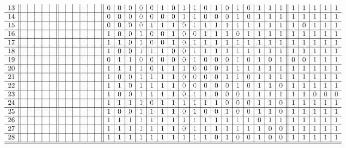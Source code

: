 \begin{table}
\[{\begin{array}{l||c|c|c|c|c||c|c|c|c|c|c||c|c|c|c|c|c|c|c|c|c|c|c|c|c|c|c|c||c|c|c|c|c}
		13 & &  &  &  &  &  &  &  &  &  &  &0 & 0 & 0 & 0 & 0 & 1 & 0 & 1 & 1 & 0 & 1 & 0 & 1 & 0 & 1 & 1 & 1&1 & 1 & 1 & 1 & 1 \\ \hline
		14 &&  &  &  &  &  &  &  &  &  &  & 0 & 0 & 0 & 0 & 0 & 0 & 0 & 1 & 1 & 0 & 0 & 0 & 1 & 0 & 1 & 1 & 1&1 & 1 & 1 & 1 & 1 \\ \hline
		15 & &  &  &  &  &  &  &  &  &  &  &0 & 0 & 0 & 0 & 1 & 1 & 1 & 0 & 1 & 1 & 1 & 1 & 1 & 1 & 1 & 1 & 1&1 & 0 & 1 & 1 & 1 \\ \hline
		16 & &  &  &  &  &  &  &  &  &  &  &1 & 0 & 0 & 1 & 0 & 0 & 1 & 0 & 0 & 1 & 1 & 1 & 0 & 1 & 1 & 1 & 1&1 & 1 & 1 & 1 & 1 \\ \hline
		17 & &  &  &  &  &  &  &  &  &  &  &1 & 1 & 0 & 1 & 0 &0 & 1 & 0 & 1 & 1 & 1 & 1 & 1 & 1 & 1 & 1 & 1&1 & 1 & 1 & 1 & 1 \\ \hline
		18 & &  &  &  &  &  &  &  &  &  &  &1 & 0 & 0 & 1 & 1 & 1 & 0 & 0 & 1 & 1 & 1 & 1 & 1 & 1 & 1 & 1 & 1&1 & 1 & 1 & 1 & 1 \\ \hline
		19 & &  &  &  &  &  &  &  &  &  &  &0 & 1 & 1 & 0 & 0 & 0 & 0 & 0 & 1 & 0 & 0 & 0 & 1 & 0 & 1 & 0 & 1&0 & 0 & 1 & 1 & 1 \\ \hline
		20 & &  &  &  &  &  &  &  &  &  &  &1 & 1 & 1 & 1 & 0 & 1 & 1 & 1 & 0 & 0 & 0 & 1 & 1 & 1 & 1 & 1 & 1&1 & 1 & 1 & 1 & 1 \\ \hline
		21 & &  &  &  &  &  &  &  &  &  &  &1 & 0 & 0 & 1 & 1 & 1 & 1 & 0 & 0 & 0 & 0 & 1 & 1 & 0 & 1 & 1 & 1&1 & 1 & 1 & 1 & 1 \\ \hline
		22 & &  &  &  &  &  &  &  &  &  &  &1 & 1 & 0 & 1 & 1 & 1 & 1 & 0 & 0 & 0 & 0 & 0 & 1 & 0 & 1 & 1 & 0&1 & 1 & 1 & 1 & 1 \\ \hline
		23 & &  &  &  &  &  &  &  &  &  &  &1 & 0 & 0 & 1 & 1 & 1 & 1 & 0 & 1 & 1 & 0 & 0 & 0 & 1 & 1 & 1 & 1&1 & 1 & 0 & 0 & 0  \\ \hline
		24 & &  &  &  &  &  &  &  &  &  &  &1 & 1 & 1 & 1 & 0 & 1 & 1 & 1 & 1 & 1 & 1 & 0 & 0 & 0 & 1 & 1 & 0&1 & 1 & 1 & 1 & 1 \\ \hline
		25 &&  &  &  &  &  &  &  &  &  &  & 1 & 0 & 0 & 1 & 1 & 1 & 1 & 0 & 1 & 0 & 0 & 1 & 0 & 0 & 1 & 1 & 0& 1 & 1 & 1 & 1 & 1\\ \hline
		26 & &  &  &  &  &  &  &  &  &  &  &1 & 1 & 1 & 1 & 1 & 1 & 1 & 1 & 1 & 1 & 1 & 1 & 1 & 1 & 0 & 1 & 1& 1 & 1 & 1 & 1 & 1\\ \hline
		27 & &  &  &  &  &  &  &  &  &  &  &1 & 1 & 1 & 1 & 1 & 1 & 1 & 0 & 1 & 1 & 1 & 1 & 1 & 1 & 1 & 0 & 0 &1 & 1 & 1 & 1 & 1\\ \hline
		28 & &  &  &  &  &  &  &  &  &  &  &1 & 1 & 1 & 1 & 1 & 1 & 1 & 1 & 1 & 1 & 0 & 1 & 0 & 0 & 1 & 0 &0 &1 & 1 & 1 & 1 & 1\\ \hline \hline

\end{array}}\]
\end{table}
